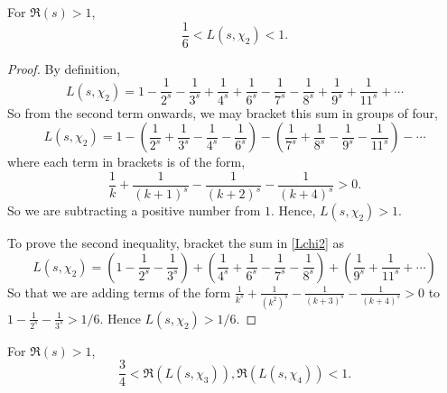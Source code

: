 \documentclass{unswmaths}
\begin{document}
    \begin{lemma}
        For $\Re(s) > 1$, 
        \begin{equation*}
            \frac{1}{6} < L(s,\chi_2) < 1.
        \end{equation*}
    \end{lemma}
    \begin{proof}
        By definition,
        \begin{equation}
        \label{Lchi2}
            L(s,\chi_2) = 1-\frac{1}{2^s}-\frac{1}{3^s}+\frac{1}{4^s}+\frac{1}{6^s}-\frac{1}{7^s}-\frac{1}{8^s}+\frac{1}{9^s}+\frac{1}{11^s}+\cdots
        \end{equation}
        So from the second term onwards, we may bracket this sum in groups of four,
        \begin{equation*}
            L(s,\chi_2) = 1-\left(\frac{1}{2^s}+\frac{1}{3^s}-\frac{1}{4^s}-\frac{1}{6^s}\right)-\left(\frac{1}{7^s}+\frac{1}{8^s}-\frac{1}{9^s}-\frac{1}{11^s}\right)-\cdots
        \end{equation*}
        where each term in brackets is of the form,
        \begin{equation*}
            \frac{1}{k}+\frac{1}{(k+1)^s}-\frac{1}{(k+2)^s}-\frac{1}{(k+4)^s} > 0.
        \end{equation*}
        So we are subtracting a positive number from $1$. Hence, $L(s,\chi_2) > 1$. 
        
        To prove the second inequality, bracket the sum in \ref{Lchi2} as
        \begin{equation*}
            L(s,\chi_2) = \left(1-\frac{1}{2^s}-\frac{1}{3^s}\right)+\left(\frac{1}{4^s}+\frac{1}{6^s}-\frac{1}{7^s}-\frac{1}{8^s}\right)+\left(\frac{1}{9^s}+\frac{1}{11^s}+\cdots\right)
        \end{equation*}
        So that we are adding terms of the form $\frac{1}{k^s}+\frac{1}{(k^2)^s}-\frac{1}{(k+3)^s}-\frac{1}{(k+4)^s} > 0$ to $1-\frac{1}{2^s}-\frac{1}{3^s} > 1/6$. Hence $L(s,\chi_2) > 1/6$.
    \end{proof}
    \begin{lemma}
        For $\Re(s) > 1$,
        \begin{equation*}
            \frac{3}{4} < \Re(L(s,\chi_3)),\Re(L(s,\chi_4)) < 1.
        \end{equation*}
    \end{lemma}
\end{document}
